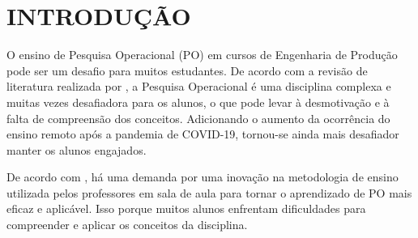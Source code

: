 \documentclass{article}
\begin{document}
\begin{abstract} %
This article presents the creation of an educational application based on the concepts of Active Learning and Problem-Based Learning, aimed at Production Engineering students. The application aims to facilitate the understanding and application of concepts and techniques of Operations Research, with a focus on Mathematical Programming problems, through an intuitive modeling interface that allows the use of practical examples, interactive graphics, and error reporting at each step of the modeling process. Using the positive points identified in other existing tools as a reference, the functionalities of the proposed application were designed to integrate the positive highlights of each solution. The application has the advantage over other existing solutions, such as spreadsheets, and programming languages, of its ease of use, making learning more effective and less dependent on mastery of the tool. By simplifying the technology, the application is more accessible and applicable to a wider audience, allowing students to focus on understanding and applying the concepts of the discipline. The objective of this article is to present a more dynamic and simple alternative that reduces technological obstacles in order to help students understand the studied concepts.
\end{abstract}

\section{INTRODUÇÃO}
O ensino de Pesquisa Operacional (PO) em cursos de Engenharia de Produção pode ser um desafio para muitos estudantes. De acordo com a revisão de literatura realizada por , a Pesquisa Operacional é uma disciplina complexa e muitas vezes desafiadora para os alunos, o que pode levar à desmotivação e à falta de compreensão dos conceitos. Adicionando o aumento da ocorrência do ensino remoto após a pandemia de COVID-19, tornou-se ainda mais desafiador manter os alunos engajados.

De acordo com , há uma demanda por uma inovação na metodologia de ensino utilizada pelos professores em sala de aula para tornar o aprendizado de PO mais eficaz e aplicável. Isso porque muitos alunos enfrentam dificuldades para compreender e aplicar os conceitos da disciplina.
\end{document}
